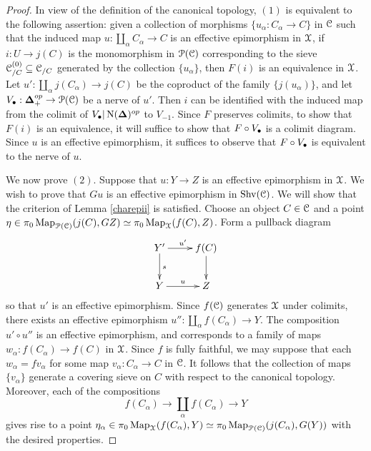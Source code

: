 \begin{proof}
In view of the definition of the canonical topology, $(1)$ is equivalent to the following assertion: given a collection of morphisms $\{ u_{\alpha}: C_{\alpha} \rightarrow C \}$ in
$\operatorname{\mathcal{C}}$ such that the induced map $u: \coprod_{\alpha} C_{\alpha} \rightarrow C$ is an effective epimorphism in $\operatorname{\mathcal{X}}$, if $i: U \rightarrow j(C)$ is the monomorphism in $\operatorname{\mathcal{P}}(\operatorname{\mathcal{C}})$
corresponding to the sieve $\operatorname{\mathcal{C}}^{(0)}_{/C} \subseteq \operatorname{\mathcal{C}}_{/C}$ generated by
the collection $\{ u_{\alpha} \}$, then $F(i)$ is an equivalence in $\operatorname{\mathcal{X}}$.
Let $u': \coprod_{\alpha} j(C_{\alpha}) \rightarrow j(C)$ be the coproduct of the family
$\{ j( u_{\alpha} ) \}$, and let $V_{\bullet}: \operatorname{{\bf \Delta}}_{+}^{op} \rightarrow \operatorname{\mathcal{P}}(\operatorname{\mathcal{C}})$ be a \Cech nerve of $u'$. Then $i$ can be identified with the induced map from the colimit of 
$V_{\bullet} | \operatorname{N}(\operatorname{{\bf \Delta}})^{op}$ to $V_{-1}$. Since $F$ preserves colimits, to show that
$F(i)$ is an equivalence, it will suffice to show that $F \circ V_{\bullet}$ is a colimit diagram.
Since $u$ is an effective epimorphism, it suffices to observe that $F \circ V_{\bullet}$ is equivalent to the \Cech nerve of $u$.

We now prove $(2)$. Suppose that $u: Y \rightarrow Z$ is an effective epimorphism in $\operatorname{\mathcal{X}}$.
We wish to prove that $Gu$ is an effective epimorphism in $\operatorname{Shv}(\operatorname{\mathcal{C}})$. We will show that the criterion of Lemma \ref{charepii} is satisfied. Choose an object $C \in \operatorname{\mathcal{C}}$ and a point
$\eta \in \pi_0 \operatorname{{Map}}_{\operatorname{\mathcal{P}}(\operatorname{\mathcal{C}})}( j(C), GZ) \simeq \pi_0 \operatorname{{Map}}_{\operatorname{\mathcal{X}}}(f(C), Z)$. Form a pullback diagram
$$ \xymatrix{ Y' \ar[r]^{u'} \ar[d]^{s} & f(C) \ar[d] \\
Y \ar[r]^{u} & Z }$$
so that $u'$ is an effective epimorphism. Since $f(\operatorname{\mathcal{C}})$ generates $\operatorname{\mathcal{X}}$ under colimits, there
exists an effective epimorphism $u'': \coprod_{\alpha} f(C_{\alpha}) \rightarrow Y$. The composition
$u' \circ u''$ is an effective epimorphism, and corresponds to a family of maps
$w_{\alpha}: f(C_{\alpha}) \rightarrow f(C)$ in $\operatorname{\mathcal{X}}$. Since $f$ is fully faithful, we may suppose
that each $w_{\alpha} = fv_{\alpha}$ for some map $v_{\alpha}: C_{\alpha} \rightarrow C$ in $\operatorname{\mathcal{C}}$. It follows that the collection of maps $\{ v_{\alpha} \}$ generate a covering sieve on $C$ with respect to the canonical topology. Moreover, each of the compositions
$$f(C_{\alpha}) \rightarrow \coprod_{\alpha} f(C_{\alpha}) \rightarrow Y $$
gives rise to a point $\eta_{\alpha} \in \pi_0 \operatorname{{Map}}_{\operatorname{\mathcal{X}}}( f(C_{\alpha}), Y) \simeq
\pi_0 \operatorname{{Map}}_{\operatorname{\mathcal{P}}(\operatorname{\mathcal{C}})}( j( C_{\alpha}), G(Y))$ with the desired properties.
\end{proof}